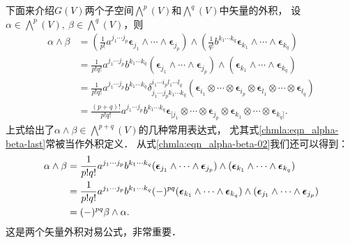 下面来介绍$G(V)$两个子空间$\bigwedge^p(V)$和$\bigwedge^q(V)$中矢量的外积，
设$\alpha\in \bigwedge^p(V), \ \beta \in \bigwedge^q(V)$，则
\setlength{\mathindent}{0em}
\begin{subequations}\label{chmla:eqn_alpha-beta}
\begin{align}
    \alpha \wedge \beta &= \left(\frac{1}{p!} a^{j_1\cdots j_p} \boldsymbol{\epsilon}_{j_1}
        \wedge \cdots \wedge \boldsymbol{\epsilon}_{j_p}\right) \wedge
        \left(\frac{1}{q!} b^{k_1\cdots k_q} \boldsymbol{\epsilon}_{k_1}
        \wedge \cdots \wedge \boldsymbol{\epsilon}_{k_q}    \right) \\
    &= \frac{1}{p! q!} a^{j_1\cdots j_p} b^{k_1\cdots k_q}
       (\boldsymbol{\epsilon}_{j_1} \wedge \cdots \wedge \boldsymbol{\epsilon}_{j_p}) \wedge
       (\boldsymbol{\epsilon}_{k_1} \wedge \cdots \wedge \boldsymbol{\epsilon}_{k_q})
       \label{chmla:eqn_alpha-beta-02} \\
    &= \frac{1}{p! q!} a^{j_1\cdots j_p} b^{k_1\cdots k_q}
       \delta_{j_1 \cdots j_p k_1 \cdots k_q}^{i_1 \cdots i_p l_1 \cdots l_q}
       (\boldsymbol{\epsilon}_{i_1} \otimes \cdots \otimes \boldsymbol{\epsilon}_{i_p} \otimes
       \boldsymbol{\epsilon}_{l_1} \otimes \cdots \otimes \boldsymbol{\epsilon}_{l_q})   \\
    &= \frac{(p+q)!}{p! q!} a^{j_1\cdots j_p} b^{k_1\cdots k_q}
       \boldsymbol{\epsilon}_{[j_1} \otimes \cdots \otimes \boldsymbol{\epsilon}_{j_p} \otimes
       \boldsymbol{\epsilon}_{k_1} \otimes \cdots \otimes \boldsymbol{\epsilon}_{k_q]} .
       \label{chmla:eqn_alpha-beta-last}
\end{align}
\end{subequations}\setlength{\mathindent}{2em}
上式给出了$\alpha \wedge \beta \in \bigwedge^{p+q}(V)$的几种常用表达式，
尤其式\eqref{chmla:eqn_alpha-beta-last}常被当作外积定义．
从式\eqref{chmla:eqn_alpha-beta-02}我们还可以得到：
\begin{align}
    \alpha \wedge \beta &=\frac{1}{p! q!} a^{j_1\cdots j_p} b^{k_1\cdots k_q}
    (\boldsymbol{\epsilon}_{j_1} \wedge \cdots \wedge \boldsymbol{\epsilon}_{j_p}) \wedge
    (\boldsymbol{\epsilon}_{k_1} \wedge \cdots \wedge \boldsymbol{\epsilon}_{k_q}) \notag \\
    &= \frac{1}{p! q!} a^{j_1\cdots j_p} b^{k_1\cdots k_q} (-)^{pq}
    (\boldsymbol{\epsilon}_{k_1} \wedge \cdots \wedge \boldsymbol{\epsilon}_{k_q}) \wedge
    (\boldsymbol{\epsilon}_{j_1} \wedge \cdots \wedge \boldsymbol{\epsilon}_{j_p})  \notag \\
    &= (-)^{pq} \beta \wedge \alpha . \label{chmla:eqn_ab-alter}
\end{align}
这是两个矢量外积对易公式，非常重要．

